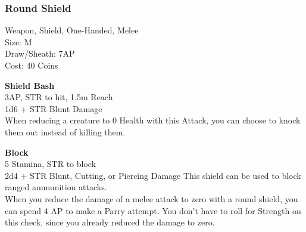 \subsubsection{Round Shield}\label{weapon:roundShield}
Weapon, Shield, One-Handed, Melee\\
Size: M\\
Draw/Sheath: 7AP\\
Cost: 40 Coins

\textbf{Shield Bash}\\
3AP, STR to hit, 1.5m Reach\\
1d6 + \texttimes STR Blunt Damage\\
When reducing a creature to 0 Health with this Attack, you can choose to knock them out instead of killing them.

\textbf{Block}\\
5 Stamina, STR to block\\
2d4 + \texttimes STR Blunt, Cutting, or Piercing Damage
This shield can be used to block ranged ammunition attacks.\\
When you reduce the damage of a melee attack to zero with a round shield, you can spend 4 AP to make a Parry attempt.
You don't have to roll for Strength on this check, since you already reduced the damage to zero.\\
